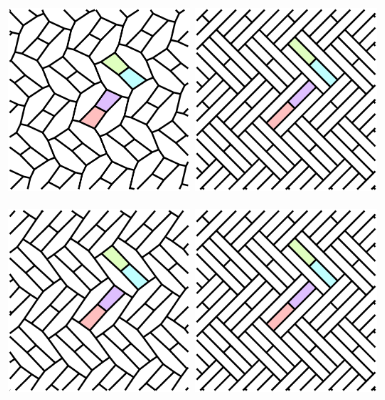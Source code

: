\documentclass{beamer}
\begin{document}
\begin{frame}
  \begin{center}
    \includegraphics[width=1.9in]{c10}
    \includegraphics[width=1.9in]{c12}
  \end{center}
\end{frame}

\begin{frame}
  \begin{center}
    \includegraphics[width=1.9in]{c11}
    \includegraphics[width=1.9in]{c12}
  \end{center}
\end{frame}
\end{document}
